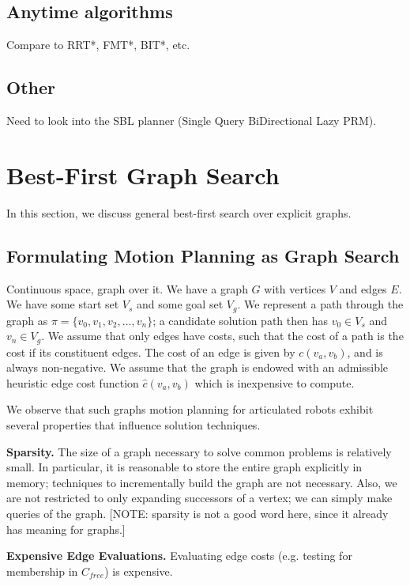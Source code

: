 \documentclass{report}
\begin{document}
\subsection{Anytime algorithms}

Compare to RRT*, FMT*, BIT*, etc.

\subsection{Other}

Need to look into the SBL planner \cite{sanchezante2001sbl}
(Single Query BiDirectional Lazy PRM).

\section{Best-First Graph Search}
\label{sec:best-first}

In this section,
we discuss general best-first search over explicit graphs.

\subsection{Formulating Motion Planning as Graph Search}

Continuous space, graph over it.
We have a graph $G$ with vertices $V$ and edges $E$.
We have some start set $V_s$ and some goal set $V_g$.
We represent a path through the graph as
$\pi = \{ v_0, v_1, v_2, \dots, v_n \}$;
a candidate solution path then has $v_0 \in V_s$ and $v_n \in V_g$.
We assume that only edges have costs,
such that the cost of a path is the cost if its constituent edges.
The cost of an edge is given by $c(v_a,v_b)$, and is always non-negative.
We assume that the graph is endowed with an admissible heuristic edge cost
function
$\hat{c}(v_a,v_b)$
which is inexpensive to compute.

We observe that such graphs motion planning for articulated robots
exhibit several properties that influence solution techniques.

\textbf{Sparsity.}
The size of a graph necessary to solve common problems
is relatively small.
In particular, it is reasonable to store the entire graph explicitly in
memory;
techniques to incrementally build the graph
are not necessary.
Also,
we are not restricted to only expanding successors of a vertex;
we can simply make queries of the graph.
[NOTE: sparsity is not a good word here, since it already has meaning
for graphs.]

\textbf{Expensive Edge Evaluations.}
Evaluating edge costs (e.g. testing for membership in $C_{free}$)
is expensive.
\end{document}
